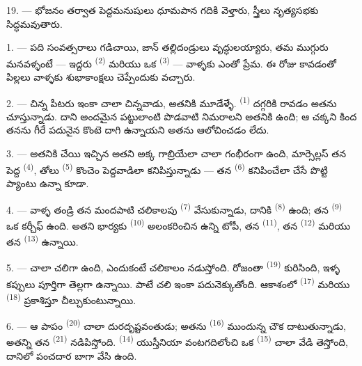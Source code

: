 19. --- భోజనం తర్వాత పెద్దమనుషులు ధూమపాన గదికి వెళ్తారు, స్త్రీలు నృత్యసభకు సిద్ధమవుతారు.

\VUsaut{5.0mm}
\VUsaut{1.6mm}
\VUsaut{2.6mm}

\VUsaut{3.0mm}

1. --- పది సంవత్సరాలు గడిచాయి, జాన్ తల్లిదండ్రులు వృద్ధులయ్యారు, తమ ముగ్గురు మనవళ్ళంటే —
ఇద్దరు  \textsuperscript{(2)} మరియు ఒక  \textsuperscript{(3)}
— వాళ్ళకు ఎంతో ప్రేమ. ఈ రోజు  కావడంతో పిల్లలు వాళ్ళకు శుభాకాంక్షలు
చెప్పేందుకు వచ్చారు.

2. --- చిన్న పీటరు ఇంకా చాలా చిన్నవాడు, అతనికి మూడేళ్ళే.  \textsuperscript{(1)}
దగ్గరికి రావడం అతను చూస్తున్నాడు. దాని అందమైన పట్టులాంటి  పొడవాటి
 నిమరాలని అతనికి ఉంది; ఆ చక్కని  కింద తనను గీరే పదునైన కొంటె
 దాగి ఉన్నాయని అతను ఆలోచించడం లేదు.

3. --- అతనికి చేయి ఇచ్చిన అతని అక్క గాబ్రియేలా చాలా గంభీరంగా ఉంది, మార్సెల్లస్ తన పెద్ద
 \textsuperscript{(4)}, తోలు  \textsuperscript{(5)}
కొంచెం పెద్దవాడిలా కనిపిస్తున్నాడు — తన  \textsuperscript{(6)} కనిపించేలా
చేసే పొట్టి ప్యాంటు ఉన్నా కూడా.

4. --- వాళ్ళ తండ్రి తన మందపాటి చలికాలపు  \textsuperscript{(7)}
వేసుకున్నాడు, దానికి  \textsuperscript{(8)} ఉంది; తన 
\textsuperscript{(9)} ఒక కర్చీఫ్ ఉంది. అతని భార్యకు  \textsuperscript{(10)}
అలంకరించిన ఉన్ని టోపీ, తన  \textsuperscript{(11)}, తన 
\textsuperscript{(12)} మరియు తన  \textsuperscript{(13)} ఉన్నాయి.

5. --- చాలా చలిగా ఉంది, ఎందుకంటే చలికాలం నడుస్తోంది. రోజంతా 
\textsuperscript{(19)} కురిసింది, ఇళ్ళ కప్పులు పూర్తిగా తెల్లగా ఉన్నాయి. 
పాటే చలి ఇంకా పదునెక్కుతోంది. ఆకాశంలో  \textsuperscript{(17)} మరియు
 \textsuperscript{(18)} ప్రకాశిస్తూ  చీల్చుకుంటున్నాయి.

\VUsaut{4.2mm}
\VUsaut{3.0mm}

6. --- ఆ పాపం  \textsuperscript{(20)} చాలా దురదృష్టవంతుడు; అతను
 \textsuperscript{(16)} ముందున్న చౌక దాటుతున్నాడు, అతన్ని తన
 \textsuperscript{(21)} నడిపిస్తోంది. 
\textsuperscript{(14)} యుస్తీనియా వంటగదిలోంచి ఒక  \textsuperscript{(15)} చాలా
వేడి  తెస్తోంది, దానిలో పంచదార బాగా వేసి ఉంది.

